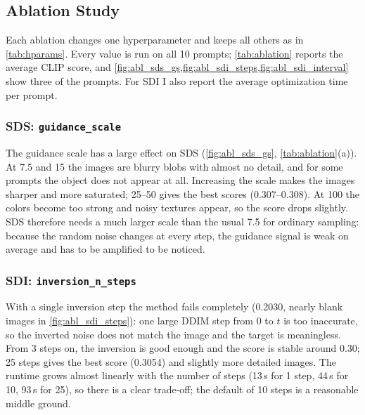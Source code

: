 \subsection{Ablation Study}
\label{sec:ablation}



Each ablation changes one hyperparameter and keeps all others as in \cref{tab:hparams}.
Every value is run on all 10 prompts; \cref{tab:ablation} reports the average CLIP score, and \cref{fig:abl_sds_gs,fig:abl_sdi_steps,fig:abl_sdi_interval} show three of the prompts.
For SDI I also report the average optimization time per prompt.

\subsubsection{SDS: \texttt{guidance\_scale}}
\label{sec:abl_sds_gs}

The guidance scale has a large effect on SDS (\cref{fig:abl_sds_gs}, \cref{tab:ablation}(a)).
At 7.5 and 15 the images are blurry blobs with almost no detail, and for some prompts the object does not appear at all.
Increasing the scale makes the images sharper and more saturated; 25--50 gives the best scores (0.307--0.308).
At 100 the colors become too strong and noisy textures appear, so the score drops slightly.
SDS therefore needs a much larger scale than the usual 7.5 for ordinary sampling: because the random noise changes at every step, the guidance signal is weak on average and has to be amplified to be noticed.

\subsubsection{SDI: \texttt{inversion\_n\_steps}}
\label{sec:abl_sdi_steps}

With a single inversion step the method fails completely (0.2030, nearly blank images in \cref{fig:abl_sdi_steps}): one large DDIM step from $0$ to $t$ is too inaccurate, so the inverted noise does not match the image and the target is meaningless.
From 3 steps on, the inversion is good enough and the score is stable around 0.30; 25 steps gives the best score (0.3054) and slightly more detailed images.
The runtime grows almost linearly with the number of steps (13\,s for 1 step, 44\,s for 10, 93\,s for 25), so there is a clear trade-off; the default of 10 steps is a reasonable middle ground.

